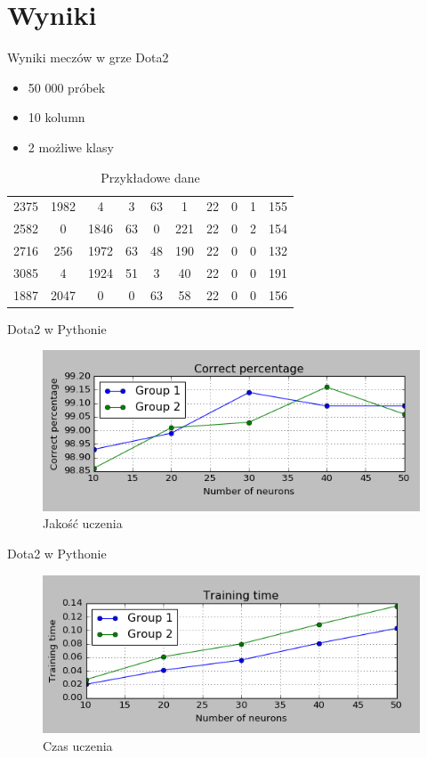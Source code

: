 \documentclass{beamer}
\begin{document}
\section{Wyniki}
\begin{frame}{Wyniki meczów w grze Dota2}
\begin{itemize}
\item 50 000 próbek
\item 10 kolumn
\item 2 możliwe klasy
\end{itemize}
\begin{table}[H]
\caption{Przykładowe dane}
\begin{tabular}{|c|c|c|c|c|c|c|c|c|c|}
\hline
2375 & 1982 & 4 & 3 & 63 & 1 & 22 & 0 & 1 & 155 \\
2582 & 0 & 1846 & 63 & 0 & 221 & 22 & 0 & 2 & 154 \\
2716 & 256 & 1972 & 63 & 48 & 190 & 22 & 0 & 0 & 132 \\
3085 & 4 & 1924 & 51 & 3 & 40 & 22 & 0 & 0 & 191 \\
1887 & 2047 & 0 & 0 & 63 & 58 & 22 & 0 & 0 & 156 \\
\hline
\end{tabular}
\end{table}

\end{frame}

\begin{frame}{Dota2 w Pythonie}
\begin{figure}[H]
\includegraphics[width=\textwidth]{wyniki_dota2_python_percentage.png}
\caption{Jakość uczenia}
\end{figure}

\end{frame}

\begin{frame}{Dota2 w Pythonie}
\begin{figure}[H]
\includegraphics[width=\textwidth]{wyniki_dota2_python_training_time.png}
\caption{Czas uczenia}
\end{figure}

\end{frame}
\end{document}
